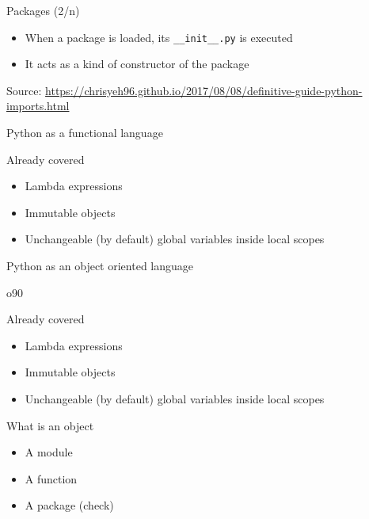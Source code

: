 \documentclass{beamer}
\begin{document}
\begin{frame}[fragile]
{\centerline{Packages (2/n)}}
\begin{itemize}
	 \item When a package is loaded, its \texttt{\_\_init\_\_.py} is executed
	 \item It acts as a kind of constructor of the package
	 
 \end{itemize}
    \begin{center}
	\tiny Source: \url{https://chrisyeh96.github.io/2017/08/08/definitive-guide-python-imports.html}
    \end{center}
\end{frame}








\begin{frame}
{\centerline{Python as a functional language}}
\end{frame}

\begin{frame}
{\centerline{Already covered}}
\begin{itemize}
    \item Lambda expressions
    \item Immutable objects
    \item Unchangeable (by default) global variables inside local scopes
\end{itemize} 
\end{frame}


\begin{frame}
{\centerline{Python as an object oriented language}}
\end{frame}

o90\begin{frame}
{\centerline{Already covered}}
\begin{itemize}
    \item Lambda expressions
    \item Immutable objects
    \item Unchangeable (by default) global variables inside local scopes
\end{itemize} 
\end{frame}


\begin{frame}
{\centerline{What is an object}}
\begin{itemize}
    \item A module
    \item A function
    \item A package (check)
\end{itemize} 
\end{frame}
\end{document}
